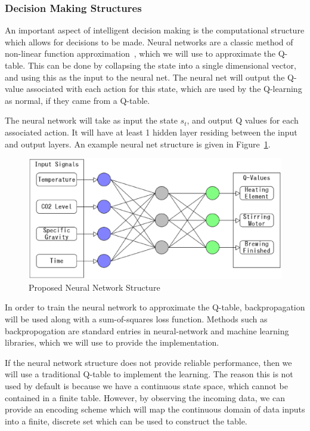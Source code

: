 \documentclass[draftclsnofoot,onecolumn,letterpaper,10pt]{IEEEtran}
\begin{document}
\subsubsection{Decision Making Structures}
An important aspect of intelligent decision making is the computational structure which allows for decisions to be made.
Neural networks are a classic method of non-linear function approximation~\cite{RussellNorvig},  which we will use to approximate the Q-table.
This can be done by collapsing the state into a single dimensional vector, and using this as the input to the neural net.
The neural net will output the Q-value associated with each action for this state, which are used by the Q-learning as normal, if they came from a Q-table.

The neural network will take as input the state $s_t$, and output Q values for each associated action.
It will have at least 1 hidden layer residing between the input and output layers.
An example neural net structure is given in Figure~\ref{fig:nn}.

\begin{figure}[h]\label{fig:nn}
\begin{center}
	\caption{Proposed Neural Network Structure}
	\includegraphics[width=\linewidth]{nn.eps}
\end{center}
\end{figure}

In order to train the neural network to approximate the Q-table, backpropagation will be used along with a sum-of-squares loss function.
Methods such as backpropogation are standard entries in neural-network and machine learning libraries, which we will use to provide the implementation.

If the neural network structure does not provide reliable performance, then we will use a traditional Q-table to implement the learning.
The reason this is not used by default is because we have a continuous state space, which cannot be contained in a finite table.
However, by observing the incoming data, we can provide an encoding scheme which will map the continuous domain of data inputs into a finite, discrete set which can be used to construct the table.
\end{document}
